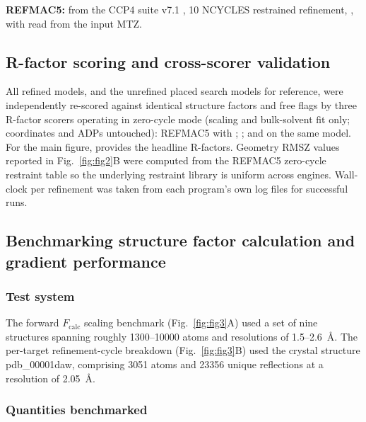 \documentclass{iucrjournals}
\begin{document}
\textbf{REFMAC5:}  from the CCP4 suite v7.1
\cite{murshudov_refmac5_2011, agirre_ccp4_2023}, 10 NCYCLES restrained
refinement, , with  read from the input
MTZ.

\subsection{R-factor scoring and cross-scorer validation}

All refined models, and the unrefined placed search models for reference, were
independently re-scored against identical structure factors and free flags by
three R-factor scorers operating in zero-cycle mode (scaling and bulk-solvent
fit only; coordinates and ADPs untouched):
REFMAC5 with  \cite{murshudov_refmac5_2011};
 \cite{liebschner_macromolecular_2019};
and  on the same model.
For the main figure,  provides the headline
R-factors. Geometry RMSZ values reported in Fig.\ \ref{fig:fig2}B were computed from the
REFMAC5 zero-cycle restraint table so the underlying restraint library is
uniform across engines.
Wall-clock per refinement was taken from each program's own log files for
successful runs.

\subsection{Benchmarking structure factor calculation and gradient performance}

\subsubsection{Test system}

The forward $F_\mathrm{calc}$ scaling benchmark (Fig.\ \ref{fig:fig3}A) used a
set of nine structures spanning roughly \num{1300}--\num{10000} atoms and
resolutions of \num{1.5}--\num{2.6}~\AA{}.
The per-target refinement-cycle breakdown (Fig.\ \ref{fig:fig3}B) used the
crystal structure pdb\_00001daw, comprising \num{3051} atoms and \num{23356}
unique reflections at a resolution of 2.05~\AA{}.

\subsubsection{Quantities benchmarked}
\end{document}
